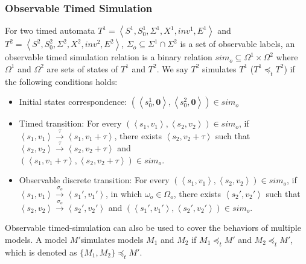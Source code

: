 \subsubsection{Observable Timed Simulation}
For two timed automata $T^1=\left\langle S^1,S_0^1,\Sigma^1,X^1,inv^1,E^1\right\rangle$ and $T^2=\left\langle S^2,S_0^2,\Sigma^2,X^2,inv^2,E^2\right\rangle$, $\Sigma_o\subseteq\Sigma^1\cap\Sigma^2$ is a set of observable labels, an observable timed simulation relation is a binary relation $sim_o\subseteq \Omega^1\times \Omega^2$ where $\Omega^1$ and $\Omega^2$ are sets of states of $T^1$ and $T^2$. We say $T^2$ simulates $T^1$ ($T^1 \preceq_t T^2$) if the following conditions holds:
\begin{itemize}
	\item Initial states correspondence: $(\left\langle s_0^1,\textbf{0}\right\rangle,\left\langle s_0^2,\textbf{0}\right\rangle)\in sim_o$
	\item Timed transition: For every $(\left\langle s_1,v_1\right\rangle,\left\langle s_2,v_2\right\rangle)\in sim_o$, if $\left\langle s_1,v_1\right\rangle\xrightarrow{\tau}\left\langle s_1,v_1+\tau\right\rangle$, there exists $\left\langle s_2,v_2+\tau\right\rangle$ such that $\left\langle s_2,v_2\right\rangle\xrightarrow{\tau}\left\langle s_2,v_2+\tau\right\rangle$ and \\$(\left\langle s_1,v_1+\tau\right\rangle,\left\langle s_2,v_2+\tau\right\rangle)\in sim_o$.
	\item Observable discrete transition: For every $(\left\langle s_1,v_1\right\rangle,\left\langle s_2,v_2\right\rangle)\in sim_o$, if $\left\langle s_1,v_1\right\rangle\xrightarrow{\sigma_o}\left\langle s_1',v_1'\right\rangle$, in which $\omega_o\in\Omega_o$, there exists $\left\langle s_2',v_2'\right\rangle$ such that $\left\langle s_2,v_2\right\rangle\xrightarrow{\sigma_o}\left\langle s_2',v_2'\right\rangle$ and $(\left\langle s_1',v_1'\right\rangle,\left\langle s_2',v_2'\right\rangle)\in sim_o$.
\end{itemize}


Observable timed-simulation can also be used to cover the behaviors of multiple models. 
A model $M'$simulates models $M_1$ and $M_2$ if $M_1\preceq_t M'$ and $M_2\preceq_t M'$,
which is denoted as $\{M_1,M_2\}\preceq_t M'$.

